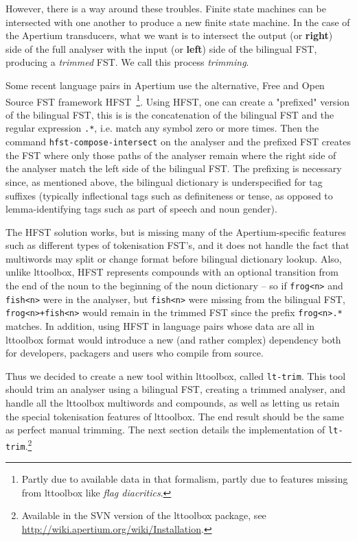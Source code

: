 \documentclass[10pt, a4paper]{article}
\newcommand{\ana}[1]{\texttt{#1}}
\newcommand{\tool}[1]{\texttt{#1}}
\begin{document}
However, there is a way around these troubles. Finite state machines
can be intersected with one another to produce a new finite state
machine. In the case of the Apertium transducers, what we want is to
intersect the output (or \textbf{right}) side of the full analyser
with the input (or \textbf{left}) side of the bilingual FST, producing
a \emph{trimmed} FST. We call this process \emph{trimming}.

Some recent language pairs in Apertium use the alternative, Free and
Open Source FST framework HFST~\cite{linden2011hfst}\footnote{Partly
  due to available data in that formalism, partly due to features
  missing from lttoolbox like \emph{flag diacritics}.}. Using HFST,
one can create a "prefixed" version of the bilingual FST, this is is
the concatenation of the bilingual FST and the regular expression
\ana{.*}, i.e. match any symbol zero or more times. Then the command
\tool{hfst-compose-intersect} on the analyser and the prefixed FST
creates the FST where only those paths of the analyser remain where
the right side of the analyser match the left side of the bilingual
FST. The prefixing is necessary since, as mentioned above, the
bilingual dictionary is underspecified for tag suffixes (typically
inflectional tags such as definiteness or tense, as opposed to
lemma-identifying tags such as part of speech and noun gender).

The HFST solution works, but is missing many of the
Apertium-specific features such as different types of tokenisation
FST's, and it does not handle the fact that multiwords may split or
change format before bilingual dictionary lookup. Also, unlike
lttoolbox, HFST represents compounds with an optional
transition from the end of the noun to the beginning of the noun
dictionary -- so if \ana{frog<n>} and \ana{fish<n>} were in the
analyser, but \ana{fish<n>} were missing from the bilingual FST,
\ana{frog<n>+fish<n>} would remain in the trimmed FST since the prefix
\ana{frog<n>.*} matches. In addition, using HFST in language
pairs whose data are all in lttoolbox format would introduce a
new (and rather complex) dependency both for developers, packagers and
users who compile from source.

Thus we decided to create a new tool within lttoolbox, called
\tool{lt-trim}. This tool should trim an analyser using a bilingual
FST, creating a trimmed analyser, and handle all the lttoolbox
multiwords and compounds, as well as letting us retain the special
tokenisation features of lttoolbox. The end result should be
the same as perfect manual trimming. The next section details  the
implementation of \tool{lt-trim}.\footnote{Available in the SVN
version of the lttoolbox package, see
\href{http://wiki.apertium.org/wiki/Installation}{http://wiki.apertium.org/wiki/Installation}.}
\end{document}
